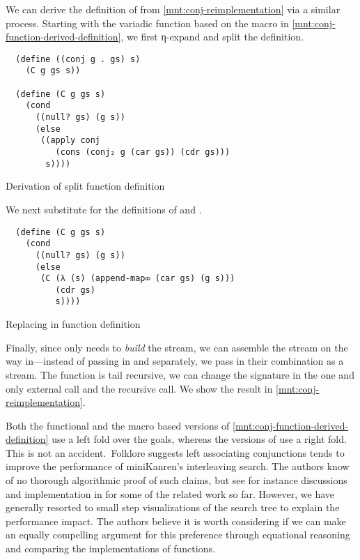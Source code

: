\documentclass[sigplan,draft,balance,pbalance,natbib=false]{acmart}
\begin{document}
We can derive the definition of  from
\cref{mnt:conj-reimplementation} via a similar process. Starting with
the variadic function based on the macro in
\cref{mnt:conj-function-derived-definition}, we first η-expand and
split the definition.

\begin{listing}[h]
\begin{verbatim}
  (define ((conj g . gs) s)
    (C g gs s))

  (define (C g gs s)
    (cond
      ((null? gs) (g s))
      (else
       ((apply conj
          (cons (conj₂ g (car gs)) (cdr gs)))
        s))))
\end{verbatim}
  \caption{Derivation of split  function definition}
  \label{mnt:conj-substituted-through}
\end{listing}
\noindent We next substitute for the definitions of  and
.

\begin{listing}[h]
\begin{verbatim}
  (define (C g gs s)
    (cond
      ((null? gs) (g s))
      (else
       (C (λ (s) (append-map∞ (car gs) (g s)))
          (cdr gs)
          s))))
\end{verbatim}
  \caption{Replacing  in  function definition}
  \label{mnt:C-substituted-through}
\end{listing}

Finally, since  only needs  to
\emph{build} the stream, we can assemble the stream on the way
in---instead of passing in  and 
separately, we pass in their combination as a stream. The function is
tail recursive, we can change the signature in the one and only
external call and the recursive call. We show the result
in \cref{mnt:conj-reimplementation}.

Both the functional and the macro based versions of
\cref{mnt:conj-function-derived-definition} use a left fold over the
goals, whereas the versions of  use a right fold.
This is not an accident.\ Folklore suggests left associating
conjunctions tends to improve the performance of miniKanren's
interleaving search. The authors know of no thorough algorithmic proof
of such claims, but see for instance discussions and implementation in
\cite{rosenblatt2019first} for some of the related work so far.
However, we have generally resorted to small step visualizations of
the search tree to explain the performance impact. The authors believe
it is worth considering if we can make an equally compelling argument
for this preference through equational reasoning and comparing the
implementations of functions.
\end{document}

